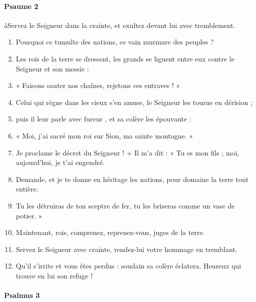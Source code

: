 \documentclass[twoside]{article}
\begin{document}
\begin{paracol}[1]{2}
\paragraph{Psaume 2}
\aa Servez le Seigneur dans la crainte, et exultez devant lui avec tremblement.



\begin{enumerate}[wide, itemsep=0mm, labelwidth=!, labelindent=0pt, label=\color{gregoriocolor}\theenumi]
\item Pourquoi ce tumulte des nations, ce vain murmure des peuples ?
\item Les rois de la terre se dressent, les grands se liguent entre eux contre le Seigneur et son messie :
\item « Faisons sauter nos chaînes, rejetons ces entraves ! »
\item Celui qui règne dans les cieux s'en amuse, le Seigneur les tourne en dérision ;
\item puis il leur parle avec fureur , et sa colère les épouvante :
\item « Moi, j'ai sacré mon roi sur Sion, ma sainte montagne. »
\item Je proclame le décret du Seigneur ! + Il m'a dit : « Tu es mon fils ; moi, aujourd'hui, je t'ai engendré.
\item Demande, et je te donne en héritage les nations, pour domaine la terre tout entière.
\item Tu les détruiras de ton sceptre de fer, tu les briseras comme un vase de potier. »
\item Maintenant, rois, comprenez, reprenez-vous, juges de la terre.
\item Servez le Seigneur avec crainte, rendez-lui votre hommage en tremblant.
\item Qu'il s'irrite et vous êtes perdus : soudain sa colère éclatera. Heureux qui trouve en lui son refuge !
\end{enumerate}

\switchcolumn*

\paragraph{Psalmus 3}



\end{paracol}
\end{document}
